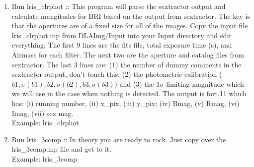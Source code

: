 \documentclass[11pt,letterpaper,dvips]{article}
\begin{document}
\begin{enumerate}
\begin{enumerate}
	  \item Run lris\_clrphot :: This program will parse the sextractor
		output and calculate mangitudes for BRI based on the output
		from sextractor.  The key is that the apertures are of a fixed
		size for all of the images.  Copy the input file 
		lris\_clrphot.inp from DLAImg/Input into your Input directory
		and edit everything.  The first 9 lines are the fits file,
		total exposure time (s), and Airmass for each filter.
		The next two are the aperture and catalog files from 
		sextractor.
		The last 3 lines are: (1) the number of dummy comments in the
		sextractor output, don't touch this; (2) the photometric
		calibration ($b1, \sigma(b1), b2, \sigma(b2), b3, \sigma(b3)$)
		and (3) the $1\sigma$ limiting magnitude which we will
		use in the case when nothing is detected.  The output is
		fort.11 which has: (i) running number, (ii) x\_pix, 
		(iii) y\_pix; (iv) Bmag, (v) Rmag, (vi) Imag, (vii) sex mag. \\
         	\quad Example: lris\_clrphot \\

	   \item Run lris\_3comp ::  In theory you are ready to rock.  Just
		copy over the lris\_3comp.inp file and get to it. \\
		\quad Example: lris\_3comp \\

	\end{enumerate}
	

\end{enumerate}
\end{document}
